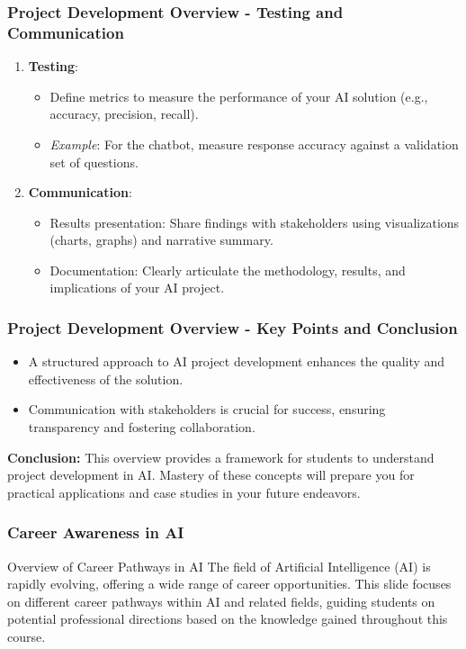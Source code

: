 \documentclass[aspectratio=169]{beamer}
\begin{document}
\begin{frame}[fragile]
    \frametitle{Project Development Overview - Testing and Communication}
    \begin{enumerate}
        \item \textbf{Testing}:
        \begin{itemize}
            \item Define metrics to measure the performance of your AI solution (e.g., accuracy, precision, recall).
            \item \textit{Example}: For the chatbot, measure response accuracy against a validation set of questions.
        \end{itemize}

        \item \textbf{Communication}:
        \begin{itemize}
            \item Results presentation: Share findings with stakeholders using visualizations (charts, graphs) and narrative summary.
            \item Documentation: Clearly articulate the methodology, results, and implications of your AI project.
        \end{itemize}
    \end{enumerate}
\end{frame}

\begin{frame}[fragile]
    \frametitle{Project Development Overview - Key Points and Conclusion}
    \begin{itemize}
        \item A structured approach to AI project development enhances the quality and effectiveness of the solution.
        \item Communication with stakeholders is crucial for success, ensuring transparency and fostering collaboration.
    \end{itemize}
    
    \textbf{Conclusion:} This overview provides a framework for students to understand project development in AI. Mastery of these concepts will prepare you for practical applications and case studies in your future endeavors.
\end{frame}

\begin{frame}[fragile]
    \frametitle{Career Awareness in AI}
    \begin{block}{Overview of Career Pathways in AI}
    The field of Artificial Intelligence (AI) is rapidly evolving, offering a wide range of career opportunities. This slide focuses on different career pathways within AI and related fields, guiding students on potential professional directions based on the knowledge gained throughout this course.
    \end{block}
\end{frame}
\end{document}
